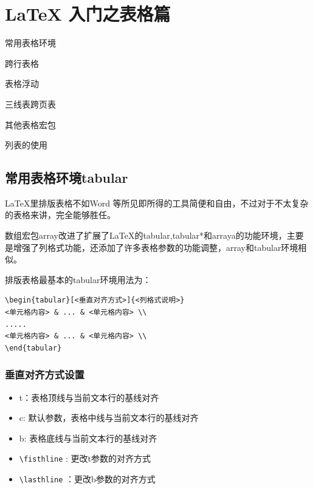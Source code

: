 \documentclass[cn,chinese,color=cyan]{elegantbook}
\begin{document}
\chapter{LaTeX 入门之表格篇}
\begin{introduction}
	\item 常用表格环境
	\item 跨行表格
	\item 表格浮动
	\item 三线表跨页表
	\item 其他表格宏包
	\item 列表的使用
\end{introduction}
\section{常用表格环境tabular}
\LaTeX 里排版表格不如Word 等所见即所得的工具简便和自由，不过对于不太复杂的表格来讲，完全能够胜任。

数组宏包array改进了扩展了\LaTeX 的tabular,tabular*和arraya的功能环境，主要是增强了列格式功能，还添加了许多表格参数的功能调整，array和tabular环境相似。

排版表格最基本的tabular环境用法为：
\begin{lstlisting}[style=R]
\begin{tabular}[<垂直对齐方式>]{<列格式说明>}
<单元格内容> & ... & <单元格内容> \\
.....
<单元格内容> & ... & <单元格内容> \\
\end{tabular}
\end{lstlisting}
\subsection{垂直对齐方式设置}
\begin{itemize}
	\item t：表格顶线与当前文本行的基线对齐
	\item c: 默认参数，表格中线与当前文本行的基线对齐
	\item b: 表格底线与当前文本行的基线对齐
	\item \verb|\fisthline| : 更改t参数的对齐方式
	\item \verb|\lasthline| ：更改b参数的对齐方式
\end{itemize}
\end{document}

